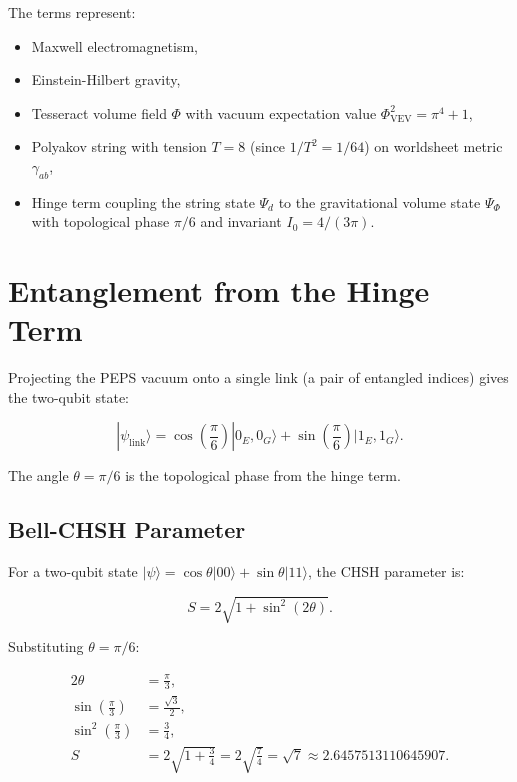 \documentclass[12pt]{article}
\begin{document}
The terms represent:
\begin{itemize}
  \item Maxwell electromagnetism,
  \item Einstein-Hilbert gravity,
  \item Tesseract volume field \(\Phi\) with vacuum expectation value \(\Phi_{\text{VEV}}^2 = \pi^4 + 1\),
  \item Polyakov string with tension \(T = 8\) (since \(1/T^2 = 1/64\)) on worldsheet metric \(\gamma_{ab}\),
  \item Hinge term coupling the string state \(\Psi_d\) to the gravitational volume state \(\Psi_\Phi\) with topological phase \(\pi/6\) and invariant \(I_0 = 4/(3\pi)\).
\end{itemize}

\section{Entanglement from the Hinge Term}

Projecting the PEPS vacuum onto a single link (a pair of entangled indices) gives the two-qubit state:

\begin{equation}
|\psi_{\text{link}}\rangle = \cos\left(\frac{\pi}{6}\right) |0_E,0_G\rangle + \sin\left(\frac{\pi}{6}\right) |1_E,1_G\rangle .
\label{eq:projected_state}
\end{equation}

The angle \(\theta = \pi/6\) is the topological phase from the hinge term.

\subsection{Bell-CHSH Parameter}

For a two-qubit state \(|\psi\rangle = \cos\theta|00\rangle + \sin\theta|11\rangle\), the CHSH parameter is:

\begin{equation}
S = 2\sqrt{1 + \sin^2(2\theta)} .
\label{eq:chsh_general}
\end{equation}

Substituting \(\theta = \pi/6\):

\begin{align}
2\theta &= \frac{\pi}{3}, \\
\sin\left(\frac{\pi}{3}\right) &= \frac{\sqrt{3}}{2}, \\
\sin^2\left(\frac{\pi}{3}\right) &= \frac{3}{4}, \\
S &= 2\sqrt{1 + \frac{3}{4}} = 2\sqrt{\frac{7}{4}} = \sqrt{7} \approx 2.6457513110645907 .
\label{eq:S_value}
\end{align}
\end{document}
